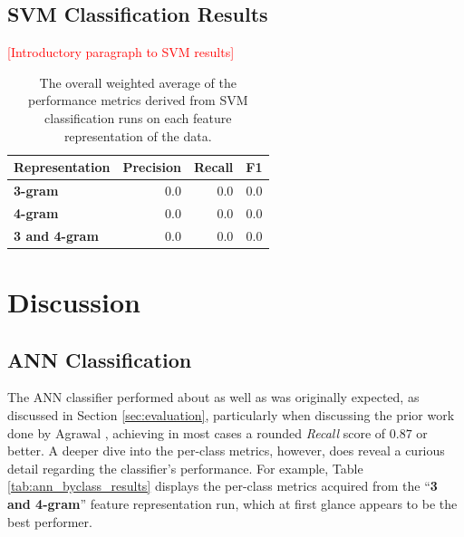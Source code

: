 \documentclass[conference]{sig-alternate-05-2015}
\newcommand{\todo}[1]{{\textcolor{red}{[#1]}}}
\begin{document}
\subsection{SVM Classification Results}\label{subsec:svm_results}

\todo{Introductory paragraph to SVM results}

\begin{table}[ht!]
  \centering
  \begin{tabular}{| l | r | r | r |}
    \hline
    \textbf{Representation} & \textbf{Precision} & \textbf{Recall} & \textbf{F1} \\
    \hline\hline
    \textbf{3-gram} & 0.0 & 0.0 & 0.0 \\
    \hline
    \textbf{4-gram} & 0.0 & 0.0 & 0.0 \\
    \hline
    \textbf{3 and 4-gram} & 0.0 & 0.0 & 0.0 \\
    \hline
  \end{tabular}
  \caption{The overall weighted average of the performance metrics derived from
  SVM classification runs on each feature representation of the data.}
  \label{tab:svm_overall_results}
\end{table}

\section{Discussion}\label{sec:discussion}

\subsection{ANN Classification}\label{subsec:ann_discussion}

The ANN classifier performed about as well as was originally expected, as
discussed in Section \ref{sec:evaluation}, particularly when discussing the
prior work done by Agrawal \cite{agrawal2018deep}, achieving in most cases a
rounded \textit{Recall} score of $0.87$ or better. A deeper dive into the
per-class metrics, however, does reveal a curious detail regarding the
classifier's performance. For example, Table \ref{tab:ann_byclass_results}
displays the per-class metrics acquired from the ``\textbf{3 and 4-gram}''
feature representation run, which at first glance appears to be the best
performer.
\end{document}

